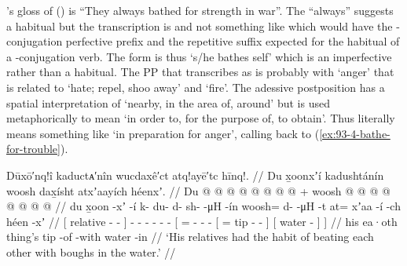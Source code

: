 \citeauthor{swanton:1909}’s gloss of (\lastx) is “They always bathed for strength in war”.
The “always” suggests a habitual but the transcription is  and not something like   which would have the -conjugation perfective prefix  and the repetitive suffix  expected for the habitual of a -conjugation verb.
The form  is thus  ‘s/he bathes self’ which is an imperfective rather than a habitual.
The PP that \citeauthor{swanton:1909} transcribes as  is probably  with  ‘anger’ that is related to  ‘hate; repel, shoo away’ and  ‘fire’.
The adessive postposition  has a spatial interpretation of ‘nearby, in the area of, around’ but is used metaphorically to mean ‘in order to, for the purpose of, to obtain’.
Thus  literally means something like ‘in preparation for anger’, calling back to (\ref{ex:93-4-bathe-for-trouble}).

\ex\label{ex:93-13-relatives-beating-each-other}%
%
\begingl
	\glpreamble	Dūxō′nq!î kaductᴀ′nîn wucdaxê′ct atq!ayē′tc hīnq!. //
	\glpreamble	Du x̱oonxʼí kadushtánín woosh dax̱ísht atxʼaayích héenxʼ. //
	\gla	{} Du  @ {} @ {} {}
		 @ {} @ {} @ {} @ {} @ {} @ {} +
		{} woosh @  @ {} @ {} @ {}
			{}  @ {} @ {} @ {} {}
			{}  @ {} {} {} //
	\glb	{} du x̱oon -xʼ -í {}
		k- du- d- sh-  -μH -ín
		{} woosh= d-  -μH -t
			{} at= xʼaa -í -ch {}
			{} héen -xʼ {} {} //
	\glc	{}[  relative - - {}]
		- - - -  - -
		{}[ = -  - -
			{}[ = tip - - {}]
			{}[ water - {}] {}] //
	\gld	{} his  {} {} {}
		 {} {} {} {} {} {}
		{} ea·oth  {} {} {}
			{} thing’s\• tip -of -with {}
			{} water -in {} //
	\glft	‘His relatives had the habit of beating each other with boughs in the water.’
		//
\endgl
\xe

